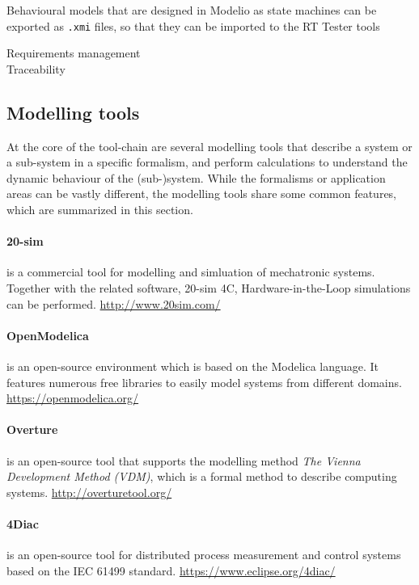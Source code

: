 Behavioural models that are designed in Modelio as state machines can be exported as \texttt{.xmi} files, so that they can be imported to the RT Tester tools

Requirements management\\
Traceability\\

\subsection{Modelling tools}

At the core of the tool-chain are several modelling tools that describe a system or a sub-system in a specific formalism, and perform calculations to understand the dynamic behaviour of the (sub-)system. While the formalisms or application areas can be vastly different, the modelling tools share some common features, which are summarized in this section. 

\paragraph{20-sim} is a commercial tool for modelling and simluation of mechatronic systems. Together with the related software, 20-sim 4C, Hardware-in-the-Loop simulations can be performed. \url{http://www.20sim.com/}

\paragraph{OpenModelica} is an open-source environment which is based on the Modelica language. It features numerous free libraries to easily model systems from different domains. \url{https://openmodelica.org/}

\paragraph{Overture} is an open-source tool that supports the modelling method \textit{The Vienna Development Method (VDM)}, which is a formal method to describe computing systems. \url{http://overturetool.org/}

\paragraph{4Diac} is an open-source tool for distributed process measurement and control systems based on the IEC 61499 standard. \url{https://www.eclipse.org/4diac/}

